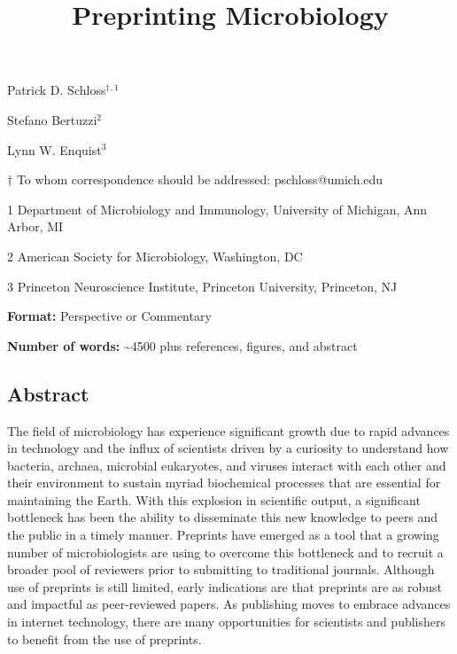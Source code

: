 \documentclass[11pt,]{article}
\title{\textbf{Preprinting Microbiology}}
\author{}
\date{}
\begin{document}
\maketitle

\begin{center}
\vspace{25mm}
Patrick D. Schloss${^\dagger}$${^{,1}}$

Stefano Bertuzzi${^2}$

Lynn W. Enquist${^3}$

\vspace{30mm}

$\dagger$ To whom correspondence should be addressed: pschloss@umich.edu

1 Department of Microbiology and Immunology, University of Michigan, Ann Arbor, MI

2 American Society for Microbiology, Washington, DC

3 Princeton Neuroscience Institute, Princeton University, Princeton, NJ

\vspace{10mm}

\textbf{Format:} Perspective or Commentary

\textbf{Number of words:} \textasciitilde4500 plus references, figures, and abstract

\end{center}

\newpage

\linenumbers

\subsection{Abstract}\label{abstract}

The field of microbiology has experience significant growth due to rapid
advances in technology and the influx of scientists driven by a
curiosity to understand how bacteria, archaea, microbial eukaryotes, and
viruses interact with each other and their environment to sustain myriad
biochemical processes that are essential for maintaining the Earth. With
this explosion in scientific output, a significant bottleneck has been
the ability to disseminate this new knowledge to peers and the public in
a timely manner. Preprints have emerged as a tool that a growing number
of microbiologists are using to overcome this bottleneck and to recruit
a broader pool of reviewers prior to submitting to traditional journals.
Although use of preprints is still limited, early indications are that
preprints are as robust and impactful as peer-reviewed papers. As
publishing moves to embrace advances in internet technology, there are
many opportunities for scientists and publishers to benefit from the use
of preprints.
\end{document}
